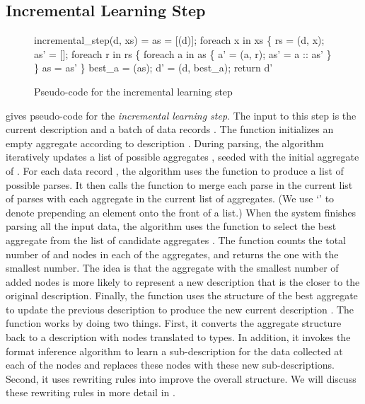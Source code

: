\subsection{Incremental Learning Step}
\begin{figure}[t]
\begin{codebox}
incremental_step(d, xs) =
  as = [(d)];
  foreach x in xs \{
    rs = (d, x);
    as' = [];
    foreach r in rs \{
      foreach a in as \{
        a' = (a, r); 
        as' = a :: as'
      \}
    \}
    as = as'
  \} 
  best_a = (as);
  d' = (d, best_a);  
  return d'
\end{codebox}
\caption{Pseudo-code for the incremental learning step}
\label{fig:inc-learning}
\end{figure}

 gives pseudo-code for the {\em incremental
  learning step}.  The input to this step is the current description
 and a batch of data records .  The 
function initializes an empty aggregate according to description
.  During parsing, the algorithm iteratively updates a list of
possible aggregates , seeded with the initial aggregate of
.  For each data record , the algorithm uses the
 function to produce a list  of possible parses.  It
then calls the  function to merge each parse  in
the current list of parses with each aggregate  in the current
list of aggregates.  (We use `\cd{::}' to denote prepending an element
onto the front of a list.)  When the system finishes parsing all the
input data, the algorithm uses the  function to
select the best aggregate from the list of candidate aggregates
.  The  function counts the total number of
 and  nodes in each of the aggregates, and returns
the one with the smallest number.
The idea is that the aggregate with the smallest number of added nodes is 
more likely to represent a new description
that is the closer to the original description. 
Finally, the  function uses the structure of the best
aggregate to update the previous description  to produce the new
current description .  The  function works by
doing two things.
First, it converts the aggregate structure back to a \pads{} description
with  nodes translated to  types. In addition,
it invokes the \learnpads{} format inference
algorithm to learn a sub-description for the data collected 
at each of the  nodes
and replaces these  nodes with these new sub-descriptions. 
Second, it uses rewriting
rules into improve the overall structure.
We will discuss these rewriting rules in more
detail in .

